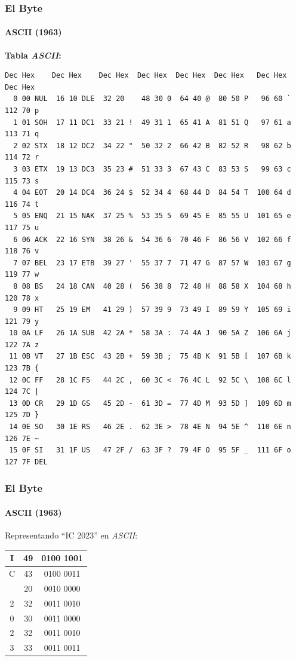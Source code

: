 \documentclass[11pt,a4paper,spanish]{beamer}
\begin{document}
\begin{frame}[fragile]

\frametitle{El \textbf{Byte}}
\framesubtitle{ASCII (1963)}
\textbf{Tabla \emph{ASCII}:}

\tiny
\begin{verbatim}
Dec Hex    Dec Hex    Dec Hex  Dec Hex  Dec Hex  Dec Hex   Dec Hex   Dec Hex
  0 00 NUL  16 10 DLE  32 20    48 30 0  64 40 @  80 50 P   96 60 `  112 70 p
  1 01 SOH  17 11 DC1  33 21 !  49 31 1  65 41 A  81 51 Q   97 61 a  113 71 q
  2 02 STX  18 12 DC2  34 22 "  50 32 2  66 42 B  82 52 R   98 62 b  114 72 r
  3 03 ETX  19 13 DC3  35 23 #  51 33 3  67 43 C  83 53 S   99 63 c  115 73 s
  4 04 EOT  20 14 DC4  36 24 $  52 34 4  68 44 D  84 54 T  100 64 d  116 74 t
  5 05 ENQ  21 15 NAK  37 25 %  53 35 5  69 45 E  85 55 U  101 65 e  117 75 u
  6 06 ACK  22 16 SYN  38 26 &  54 36 6  70 46 F  86 56 V  102 66 f  118 76 v
  7 07 BEL  23 17 ETB  39 27 '  55 37 7  71 47 G  87 57 W  103 67 g  119 77 w
  8 08 BS   24 18 CAN  40 28 (  56 38 8  72 48 H  88 58 X  104 68 h  120 78 x
  9 09 HT   25 19 EM   41 29 )  57 39 9  73 49 I  89 59 Y  105 69 i  121 79 y
 10 0A LF   26 1A SUB  42 2A *  58 3A :  74 4A J  90 5A Z  106 6A j  122 7A z
 11 0B VT   27 1B ESC  43 2B +  59 3B ;  75 4B K  91 5B [  107 6B k  123 7B {
 12 0C FF   28 1C FS   44 2C ,  60 3C <  76 4C L  92 5C \  108 6C l  124 7C |
 13 0D CR   29 1D GS   45 2D -  61 3D =  77 4D M  93 5D ]  109 6D m  125 7D }
 14 0E SO   30 1E RS   46 2E .  62 3E >  78 4E N  94 5E ^  110 6E n  126 7E ~
 15 0F SI   31 1F US   47 2F /  63 3F ?  79 4F O  95 5F _  111 6F o  127 7F DEL
\end{verbatim}

\end{frame}

\begin{frame}

\frametitle{El \textbf{Byte}}
\framesubtitle{ASCII (1963)}

    Representando ``IC 2023'' en \emph{ASCII}:

\huge
\centering
\begin{tabular}{c  c  c}
    I & 49 & 0100 1001\\ \hline
    C & 43 & 0100 0011\\ \hline
      & 20 & 0010 0000\\ \hline
    2 & 32 & 0011 0010\\ \hline
    0 & 30 & 0011 0000\\ \hline
    2 & 32 & 0011 0010\\ \hline
    3 & 33 & 0011 0011\\
\end{tabular}

\end{frame}
\end{document}
